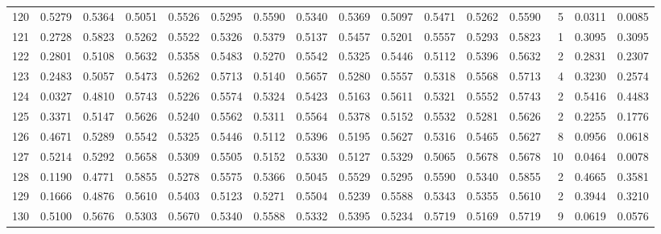 \begin{tabular}{lrrrrrrrrrrrrrrr}
120 &      0.5279 &  0.5364 &  0.5051 &  0.5526 &  0.5295 &  0.5590 &  0.5340 &  0.5369 &  0.5097 &  0.5471 &   0.5262 &     0.5590 &      5 &                    0.0311 &                     0.0085 \\
121 &      0.2728 &  0.5823 &  0.5262 &  0.5522 &  0.5326 &  0.5379 &  0.5137 &  0.5457 &  0.5201 &  0.5557 &   0.5293 &     0.5823 &      1 &                    0.3095 &                     0.3095 \\
122 &      0.2801 &  0.5108 &  0.5632 &  0.5358 &  0.5483 &  0.5270 &  0.5542 &  0.5325 &  0.5446 &  0.5112 &   0.5396 &     0.5632 &      2 &                    0.2831 &                     0.2307 \\
123 &      0.2483 &  0.5057 &  0.5473 &  0.5262 &  0.5713 &  0.5140 &  0.5657 &  0.5280 &  0.5557 &  0.5318 &   0.5568 &     0.5713 &      4 &                    0.3230 &                     0.2574 \\
124 &      0.0327 &  0.4810 &  0.5743 &  0.5226 &  0.5574 &  0.5324 &  0.5423 &  0.5163 &  0.5611 &  0.5321 &   0.5552 &     0.5743 &      2 &                    0.5416 &                     0.4483 \\
125 &      0.3371 &  0.5147 &  0.5626 &  0.5240 &  0.5562 &  0.5311 &  0.5564 &  0.5378 &  0.5152 &  0.5532 &   0.5281 &     0.5626 &      2 &                    0.2255 &                     0.1776 \\
126 &      0.4671 &  0.5289 &  0.5542 &  0.5325 &  0.5446 &  0.5112 &  0.5396 &  0.5195 &  0.5627 &  0.5316 &   0.5465 &     0.5627 &      8 &                    0.0956 &                     0.0618 \\
127 &      0.5214 &  0.5292 &  0.5658 &  0.5309 &  0.5505 &  0.5152 &  0.5330 &  0.5127 &  0.5329 &  0.5065 &   0.5678 &     0.5678 &     10 &                    0.0464 &                     0.0078 \\
128 &      0.1190 &  0.4771 &  0.5855 &  0.5278 &  0.5575 &  0.5366 &  0.5045 &  0.5529 &  0.5295 &  0.5590 &   0.5340 &     0.5855 &      2 &                    0.4665 &                     0.3581 \\
129 &      0.1666 &  0.4876 &  0.5610 &  0.5403 &  0.5123 &  0.5271 &  0.5504 &  0.5239 &  0.5588 &  0.5343 &   0.5355 &     0.5610 &      2 &                    0.3944 &                     0.3210 \\
130 &      0.5100 &  0.5676 &  0.5303 &  0.5670 &  0.5340 &  0.5588 &  0.5332 &  0.5395 &  0.5234 &  0.5719 &   0.5169 &     0.5719 &      9 &                    0.0619 &                     0.0576 \\

\end{tabular}
